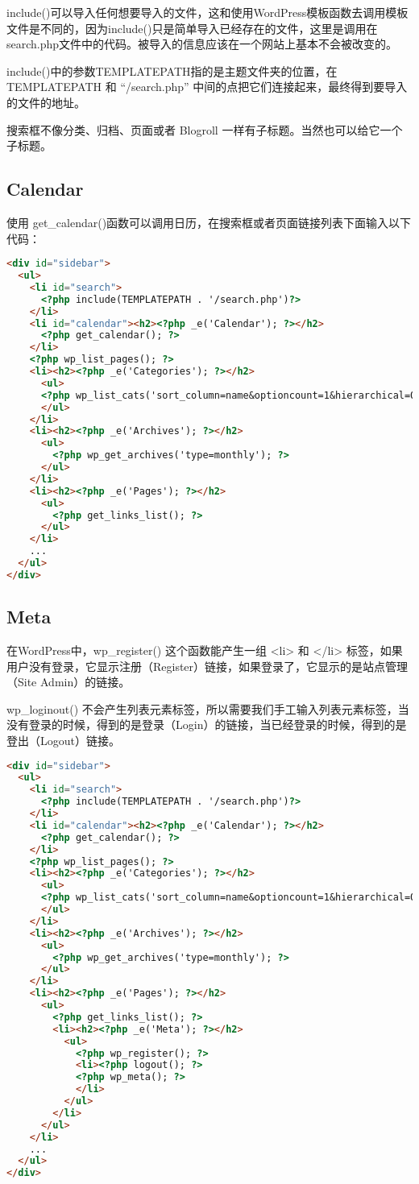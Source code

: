 include()可以导入任何想要导入的文件，这和使用WordPress模板函数去调用模板文件是不同的，因为include()只是简单导入已经存在的文件，这里是调用在 search.php文件中的代码。被导入的信息应该在一个网站上基本不会被改变的。

include()中的参数TEMPLATEPATH指的是主题文件夹的位置，在 TEMPLATEPATH 和 “/search.php” 中间的点把它们连接起来，最终得到要导入的文件的地址。

搜索框不像分类、归档、页面或者 Blogroll 一样有子标题。当然也可以给它一个子标题。


\subsection{Calendar}

使用 get\_calendar()函数可以调用日历，在搜索框或者页面链接列表下面输入以下代码：


\begin{lstlisting}[language=HTML]
<div id="sidebar">
  <ul>
    <li id="search">
      <?php include(TEMPLATEPATH . '/search.php')?>
    </li>
    <li id="calendar"><h2><?php _e('Calendar'); ?></h2>
      <?php get_calendar(); ?>
    </li>
    <?php wp_list_pages(); ?>
    <li><h2><?php _e('Categories'); ?></h2>
      <ul>
      <?php wp_list_cats('sort_column=name&optioncount=1&hierarchical=0'); ?>
      </ul>
    </li>
    <li><h2><?php _e('Archives'); ?></h2>
      <ul>
        <?php wp_get_archives('type=monthly'); ?>
      </ul>
    </li>
    <li><h2><?php _e('Pages'); ?></h2>
      <ul>
        <?php get_links_list(); ?>
      </ul>
    </li>
    ...
  </ul>
</div>
\end{lstlisting}


\subsection{Meta}

在WordPress中，wp\_register() 这个函数能产生一组 <li> 和 </li> 标签，如果用户没有登录，它显示注册（Register）链接，如果登录了，它显示的是站点管理（Site Admin）的链接。

wp\_loginout() 不会产生列表元素标签，所以需要我们手工输入列表元素标签，当没有登录的时候，得到的是登录（Login）的链接，当已经登录的时候，得到的是登出（Logout）链接。


\begin{lstlisting}[language=HTML]
<div id="sidebar">
  <ul>
    <li id="search">
      <?php include(TEMPLATEPATH . '/search.php')?>
    </li>
    <li id="calendar"><h2><?php _e('Calendar'); ?></h2>
      <?php get_calendar(); ?>
    </li>
    <?php wp_list_pages(); ?>
    <li><h2><?php _e('Categories'); ?></h2>
      <ul>
      <?php wp_list_cats('sort_column=name&optioncount=1&hierarchical=0'); ?>
      </ul>
    </li>
    <li><h2><?php _e('Archives'); ?></h2>
      <ul>
        <?php wp_get_archives('type=monthly'); ?>
      </ul>
    </li>
    <li><h2><?php _e('Pages'); ?></h2>
      <ul>
        <?php get_links_list(); ?>
        <li><h2><?php _e('Meta'); ?></h2>
          <ul>
            <?php wp_register(); ?>
            <li><?php logout(); ?>
            <?php wp_meta(); ?>
            </li>
          </ul>
        </li>
      </ul>
    </li>
    ...
  </ul>
</div>
\end{lstlisting}

